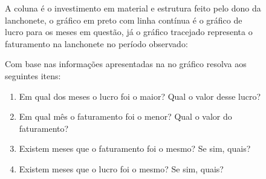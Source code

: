 \documentclass[oneside,a4paper,12pt]{article}
\begin{document}
\begin{enumerate}
\begin{figure}[!hbt]
\begin{multicols}{2}
\columnbreak
A coluna é o investimento em material e estrutura feito pelo dono da lanchonete, o gráfico em preto com linha contínua é o gráfico de lucro para os meses em questão, já o gráfico tracejado representa o faturamento na lanchonete no período observado:

Com base nas informações apresentadas na no gráfico resolva aos seguintes itens:
\begin{enumerate}
\item Em qual dos meses o lucro foi o maior? Qual o valor desse lucro? 
\item Em qual mês o faturamento foi o menor? Qual o valor do faturamento?
\item Existem meses que o faturamento foi o mesmo? Se sim, quais?
\item Existem meses que o lucro foi o mesmo? Se sim, quais?
\end{enumerate}

\end{multicols}
\end{figure}


\end{enumerate}
\end{document}
